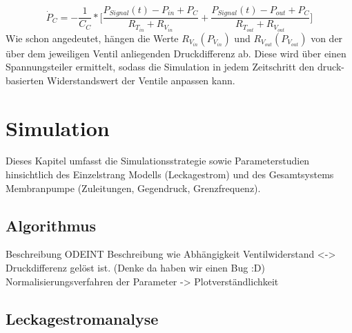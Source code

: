 \documentclass[fontsize=12pt, a4paper]{scrartcl}
\begin{document}
\begin{equation}
	\dot{P}_{C} = - \frac{1}{C_{C}} * \biggl[\frac{P_{Signal}(t)-P_{in}+P_{C}}{R_{T_{in}}+R_{V_{in}}} + \frac{P_{Signal}(t)-P_{out}+P_{C}}{R_{T_{out}}+R_{V_{out}}}\biggr]
\end{equation}
Wie schon angedeutet, hängen die Werte $R_{V_{in}}(P_{V_{in}})$ und $R_{V_{out}}(P_{V_{out}})$ von der über dem jeweiligen Ventil anliegenden Druckdifferenz ab. Diese wird über einen Spannungsteiler ermittelt, sodass die Simulation in jedem Zeitschritt den druck-basierten Widerstandswert der Ventile anpassen kann.

\section{Simulation}

Dieses Kapitel umfasst die Simulationsstrategie sowie Parameterstudien hinsichtlich des Einzelstrang Modells (Leckagestrom) und des Gesamtsystems Membranpumpe (Zuleitungen, Gegendruck, Grenzfrequenz).

\subsection{Algorithmus}

Beschreibung ODEINT
Beschreibung wie Abhängigkeit Ventilwiderstand <-> Druckdifferenz gelöst ist. (Denke da haben wir einen Bug :D)
Normalisierungsverfahren der Parameter -> Plotverständlichkeit

\subsection{Leckagestromanalyse}
\end{document}
